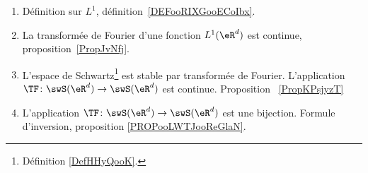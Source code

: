 	\label{THEMEooTransformFourier}
\begin{enumerate}
	\item
	      Définition sur \( L^1\), définition~\ref{DEFooRIXGooECoIbx}.
	\item
	      La transformée de Fourier d'une fonction \( L^1(\eR^d)\) est continue, proposition~\ref{PropJvNfj}.
	\item
	      L'espace de Schwartz\footnote{Définition \ref{DefHHyQooK}.} est stable par transformée de Fourier. L'application \( \TF\colon \swS(\eR^d)\to \swS(\eR^d)\) est continue. Proposition ~\ref{PropKPsjyzT}
	\item
	      L'application \( \TF\colon \swS(\eR^d)\to \swS(\eR^d)\) est une bijection. Formule d'inversion, proposition \ref{PROPooLWTJooReGlaN}.
\end{enumerate}
